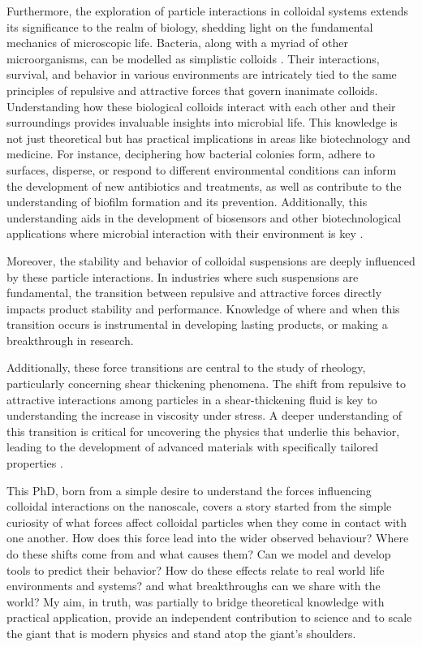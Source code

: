 Furthermore, the exploration of particle interactions in colloidal systems extends its significance to the realm of biology, shedding light on the fundamental mechanics of microscopic life. Bacteria, along with a myriad of other microorganisms, can be modelled as simplistic colloids \cite{livingbact}. Their interactions, survival, and behavior in various environments are intricately tied to the same principles of repulsive and attractive forces that govern inanimate colloids. Understanding how these biological colloids interact with each other and their surroundings provides invaluable insights into microbial life. This knowledge is not just theoretical but has practical implications in areas like biotechnology and medicine. For instance, deciphering how bacterial colonies form, adhere to surfaces, disperse, or respond to different environmental conditions can inform the development of new antibiotics and treatments, as well as contribute to the understanding of biofilm formation and its prevention. Additionally, this understanding aids in the development of biosensors and other biotechnological applications where microbial interaction with their environment is key \cite{biosense}. 

Moreover, the stability and behavior of colloidal suspensions are deeply influenced by these particle interactions. In industries where such suspensions are fundamental, the transition between repulsive and attractive forces directly impacts product stability and performance. Knowledge of where and when this transition occurs is instrumental in developing lasting products, or making a breakthrough in research.

Additionally, these force transitions are central to the study of rheology, particularly concerning shear thickening phenomena. The shift from repulsive to attractive interactions among particles in a shear-thickening fluid is key to understanding the increase in viscosity under stress. A deeper understanding of this transition is critical for uncovering the physics that underlie this behavior, leading to the development of advanced materials with specifically tailored properties \cite{rehoreview}.

This PhD, born from a simple desire to understand the forces influencing colloidal interactions on the nanoscale, covers a story started from the simple curiosity of what forces affect colloidal particles when they come in contact with one another. How does this force lead into the wider observed behaviour? Where do these shifts come from and what causes them? Can we model and develop tools to predict their behavior? How do these effects relate to real world life environments and systems? and what breakthroughs can we share with the world? My aim, in truth, was partially to bridge theoretical knowledge with practical application, provide an independent contribution to science and to scale the giant that is modern physics and stand atop the giant's shoulders.


